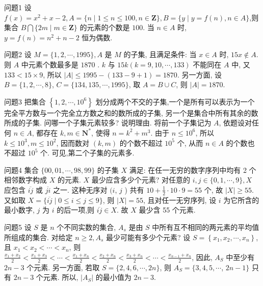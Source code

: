 
问题1 设 $f(x)=x^2+x-2, A=\{n \mid 1 \leqslant n \leqslant 100, n \in \mathbf{Z}\}, B=\{y \mid y=f(n), n \in A\}$,则集合 $B \bigcap\{2 m \mid m \in \mathbf{Z}\}$ 的元素的个数是
$100$. 当 $n \in A$ 时, $y=f(n)=n^2+n-2$ 恒为偶数.



问题2 设 $M=\{1,2, \cdots, 1995\}, A$ 是 $M$ 的子集, 且满足条件: 当 $x \in A$ 时, $15 x \notin A$. 则 $A$ 中元素个数最多是
$1870$ . $k$ 与 $15 k(k=9,10, \cdots, 133)$ 不能同在 $A$ 中, 又 $133<15 \times 9$, 所以 $|A| \leqslant 1995-(133-9+1)=1870$. 另一方面, 设 $B=\{1,2, \cdots, 8\}$, $C=\{134,135, \cdots, 1995\}$, 取 $A=B \cup C$, 则 $|A|=1870$.



问题3 把集合 $\left\{1,2, \cdots, 10^6\right\}$ 划分成两个不交的子集,一个是所有可以表示为一个完全平方数与一个完全立方数之和的数所成的子集, 另一个是集合中所有其余的数所成的子集.
问哪一个子集元素较多? 说明理由.
将前一个子集记为 $A$, 依题设对任何 $n \in A$, 都存在 $k, m \in \mathbf{N}^*$, 使得 $n=k^2+m^3$. 由于 $n \leqslant 10^6$, 所以 $k \leqslant 10^3, m \leqslant 10^2$, 因而数对 $(k, m)$ 的个数不超过 $10^5$ 个, 从而 $n \in A$ 的个数也不超过 $10^5$ 个.
可见,第二个子集的元素多.



问题4 集合 $\{00,01, \cdots, 98,99\}$ 的子集 $X$ 满足: 在任一无穷的数字序列中均有 2 个相邻数字构成 $X$ 的元素.
$X$ 最少应含多少个元素?
对任意的 $i, j \in\{0,1, \cdots, 9\}, X$ 应包含 $\overline{i j}$ 或 $\overline{j i}$ 之一.
这种无序对 $(i$, $j$ ) 共有 $10+\frac{1}{2} \cdot 10 \cdot 9=55$ 个, 故 $|X| \geqslant 55$. 又如取 $X=\{\overline{i j} \mid 0 \leqslant i \leqslant j \leqslant 9\}$, 则 $|X|=55$, 且对任一无穷序列, 设 $i$ 为它所含的最小数字, $j$ 为 $i$ 的后一项,则 $\overline{i j} \in X$. 故 $X$ 最少含 55 个元素.



问题5 设 $S$ 是 $n$ 个不同实数的集合, $A_s$ 是由 $S$ 中所有互不相同的两元素的平均值所组成的集合.
对给定 $n \geqslant 2, A_s$ 最少可能有多少个元素?
设 $S=\left\{x_1, x_2, \cdots, x_n\right\}$, 且 $x_1<x_2<\cdots<x_n$, 则 $\frac{x_1+x_2}{2}<\frac{x_1+x_3}{2} <\cdots<\frac{x_1+x_n}{2}<\frac{x_2+x_n}{2}<\frac{x_3+x_n}{2}<\cdots<\frac{x_{n-1}+x_n}{2}$, 因此, $A_S$ 中至少有 $2 n-3$ 个元素.
另一方面, 若取 $S=\{2,4,6, \cdots, 2 n\}$, 则 $A_S=\{3,4,5, \cdots$, $2 n-1\}$ 只有 $2 n-3$ 个元素.
所以, $\left|A_S\right|$ 的最小值为 $2 n-3$.



